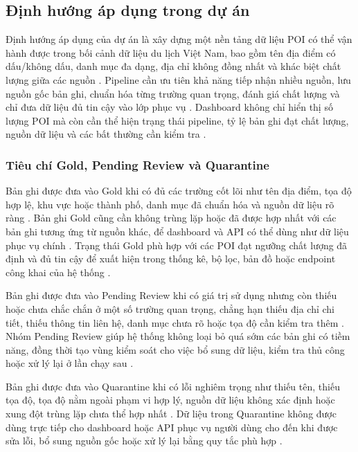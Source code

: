 \documentclass[12pt,a4paper]{article}
\begin{document}
\subsection{Định hướng áp dụng trong dự án}

Định hướng áp dụng của dự án là xây dựng một nền tảng dữ liệu POI có thể vận hành được trong bối cảnh dữ liệu du lịch Việt Nam, bao gồm tên địa điểm có dấu/không dấu, danh mục đa dạng, địa chỉ không đồng nhất và khác biệt chất lượng giữa các nguồn \cite{yeboah2021}. Pipeline cần ưu tiên khả năng tiếp nhận nhiều nguồn, lưu nguồn gốc bản ghi, chuẩn hóa từng trường quan trọng, đánh giá chất lượng và chỉ đưa dữ liệu đủ tin cậy vào lớp phục vụ \cite{ibmDataQuality}. Dashboard không chỉ hiển thị số lượng POI mà còn cần thể hiện trạng thái pipeline, tỷ lệ bản ghi đạt chất lượng, nguồn dữ liệu và các bất thường cần kiểm tra \cite{tableauKpi}.\par

\subsubsection{Tiêu chí Gold, Pending Review và Quarantine}

Bản ghi được đưa vào Gold khi có đủ các trường cốt lõi như tên địa điểm, tọa độ hợp lệ, khu vực hoặc thành phố, danh mục đã chuẩn hóa và nguồn dữ liệu rõ ràng \cite{ibmDataQuality}. Bản ghi Gold cũng cần không trùng lặp hoặc đã được hợp nhất với các bản ghi tương ứng từ nguồn khác, để dashboard và API có thể dùng như dữ liệu phục vụ chính \cite{ibmLineage}. Trạng thái Gold phù hợp với các POI đạt ngưỡng chất lượng đã định và đủ tin cậy để xuất hiện trong thống kê, bộ lọc, bản đồ hoặc endpoint công khai của hệ thống \cite{tableauKpi}.\par

Bản ghi được đưa vào Pending Review khi có giá trị sử dụng nhưng còn thiếu hoặc chưa chắc chắn ở một số trường quan trọng, chẳng hạn thiếu địa chỉ chi tiết, thiếu thông tin liên hệ, danh mục chưa rõ hoặc tọa độ cần kiểm tra thêm \cite{ibmDataQuality}. Nhóm Pending Review giúp hệ thống không loại bỏ quá sớm các bản ghi có tiềm năng, đồng thời tạo vùng kiểm soát cho việc bổ sung dữ liệu, kiểm tra thủ công hoặc xử lý lại ở lần chạy sau \cite{ibmLineage}.\par

Bản ghi được đưa vào Quarantine khi có lỗi nghiêm trọng như thiếu tên, thiếu tọa độ, tọa độ nằm ngoài phạm vi hợp lý, nguồn dữ liệu không xác định hoặc xung đột trùng lặp chưa thể hợp nhất \cite{ibmDataQuality}. Dữ liệu trong Quarantine không được dùng trực tiếp cho dashboard hoặc API phục vụ người dùng cho đến khi được sửa lỗi, bổ sung nguồn gốc hoặc xử lý lại bằng quy tắc phù hợp \cite{openapiSpec}.\par
\end{document}
